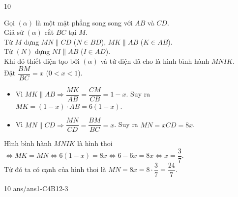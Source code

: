 \begin{indapan}{10}
\begin{ex}
{\begin{center}
        \end{center}
        Gọi $(\alpha)$ là một mặt phẳng song song với $AB$ và $CD$. \\
        Giả sử $(\alpha)$ cắt $BC$ tại $M$. \\
        Từ $M$ dựng $MN \parallel CD$ ($N\in BD$), $MK\parallel AB$ ($K\in AB$).\\
        Từ $(N)$ dựng $NI\parallel AB$ ($I\in AD$).\\
        Khi đó thiết diện tạo bởi $(\alpha)$ và tứ diện đã cho là hình bình hành $MNIK$.\\
        Đặt $\dfrac{BM}{BC}=x$ ($0<x<1$).
        \begin{itemize}
            \item Vì $MK\parallel AB\Rightarrow\dfrac{MK}{AB}=\dfrac{CM}{CB}=1-x$. Suy ra $MK=(1-x)\cdot AB=6(1-x)$.
            \item Vì $MN\parallel CD \Rightarrow \dfrac{MN}{CD}=\dfrac{BM}{BC}=x$. Suy ra $MN=xCD=8x$.
        \end{itemize}
        Hình bình hành $MNIK$ là hình thoi $\Leftrightarrow MK=MN \Leftrightarrow 6(1-x)=8x \Leftrightarrow 6-6x=8x \Leftrightarrow x=\dfrac{3}{7}$.\\
        Từ đó ta có cạnh của hình thoi là $MN=8x=8\cdot \dfrac{3}{7}=\dfrac{24}{7}$.
    }
\end{ex}
\begin{indapan}{10}
    {ans/ans1-C4B12-3}
\end{indapan}


\end{indapan}
